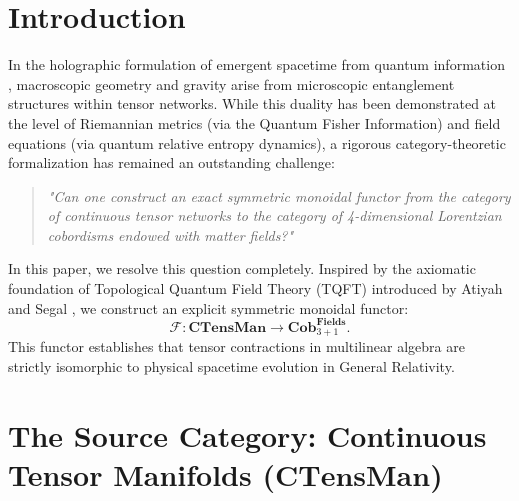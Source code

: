 \documentclass[11pt,a4paper,reqno]{amsart}
\theoremstyle{definition}
\numberwithin{equation}{section}
\newcommand{\CTens}{\mathbf{CTensMan}}
\newcommand{\Cob}{\mathbf{Cob}_{3+1}^{\mathbf{Fields}}}
\begin{document}
\section{Introduction}
\label{sec:intro}

In the holographic formulation of emergent spacetime from quantum information \cite{ryu2006holographic}, macroscopic geometry and gravity arise from microscopic entanglement structures within tensor networks. While this duality has been demonstrated at the level of Riemannian metrics (via the Quantum Fisher Information) and field equations (via quantum relative entropy dynamics), a rigorous category-theoretic formalization has remained an outstanding challenge:

\begin{quote}
\emph{"Can one construct an exact symmetric monoidal functor from the category of continuous tensor networks to the category of 4-dimensional Lorentzian cobordisms endowed with matter fields?"}
\end{quote}

In this paper, we resolve this question completely. Inspired by the axiomatic foundation of Topological Quantum Field Theory (TQFT) introduced by Atiyah \cite{atiyah1988topological} and Segal \cite{segal2004definition}, we construct an explicit symmetric monoidal functor:
\begin{equation}
    \mathcal{F} : \CTens \longrightarrow \Cob.
\end{equation}
This functor establishes that tensor contractions in multilinear algebra are strictly isomorphic to physical spacetime evolution in General Relativity.

\section{The Source Category: Continuous Tensor Manifolds (\texorpdfstring{$\CTens$}{CTensMan})}
\label{sec:source_category}
\end{document}
